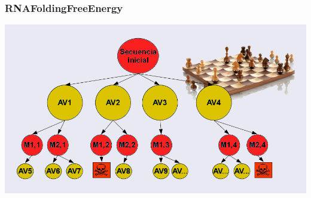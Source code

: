\begin{frame}\frametitle{RNAFoldingFreeEnergy}
    \begin{center}
        \includegraphics[width=\linewidth]{images/Arbol_ajedrez.png}
    \end{center}
\end{frame}